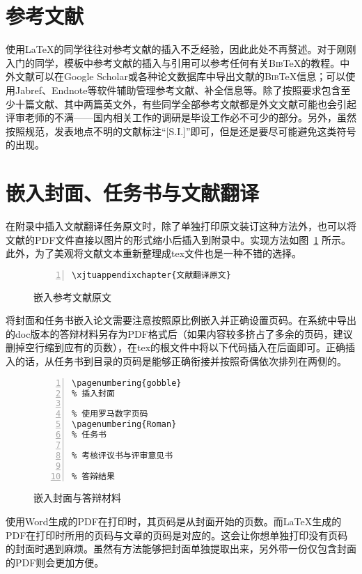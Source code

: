 \section{参考文献}
使用\LaTeX 的同学往往对参考文献的插入不乏经验，因此此处不再赘述。对于刚刚入门的同学，模板中参考文献的插入与引用可以参考任何有关\textsc{Bib}\TeX 的教程。中外文献可以在Google Scholar或各种论文数据库中导出文献的\textsc{Bib}\TeX 信息；可以使用Jabref、Endnote等软件辅助管理参考文献、补全信息等。除了按照要求包含至少十篇文献、其中两篇英文外，有些同学全部参考文献都是外文文献可能也会引起评审老师的不满——国内相关工作的调研是毕设工作必不可少的部分。另外，虽然按照规范，发表地点不明的文献标注``[S.I.]''即可，但是还是要尽可能避免这类符号的出现。

\section{嵌入封面、任务书与文献翻译}

在附录中插入文献翻译任务原文时，除了单独打印原文装订这种方法外，也可以将文献的PDF文件直接以图片的形式缩小后插入到附录中。实现方法如图~\ref{fig:fig_trans}
所示。此外，为了美观将文献文本重新整理成tex文件也是一种不错的选择。
\begin{figure}[h]
  {
  \fontsize{10pt}{12pt}\selectfont
  \setmainfont{Courier New}
  \begin{lstlisting}[showstringspaces=false,numbers=left,xleftmargin=3em]
\xjtuappendixchapter{文献翻译原文}

  \end{lstlisting}
  }
\caption{嵌入参考文献原文}
\label{fig:fig_trans}
\end{figure}

将封面和任务书嵌入论文需要注意按照原比例嵌入并正确设置页码。在系统中导出的doc版本的答辩材料另存为PDF格式后（如果内容较多挤占了多余的页码，建议删掉空行缩到应有的页数），在tex的根文件中将以下代码插入在\verb||后面即可。正确插入的话，从任务书到目录的页码是能够正确衔接并按照奇偶依次排列在两侧的。
\begin{figure}[h]
  {
  \fontsize{10pt}{12pt}\selectfont
  \setmainfont{Courier New}
  \begin{lstlisting}[showstringspaces=false,numbers=left,xleftmargin=3em]
% 停止页码编号
\pagenumbering{gobble}
% 插入封面

% 使用罗马数字页码
\pagenumbering{Roman}
% 任务书

% 考核评议书与评审意见书

% 答辩结果

  \end{lstlisting}
  }
\caption{嵌入封面与答辩材料}
\label{fig:fig_cover}
\end{figure}

使用Word生成的PDF在打印时，其页码是从封面开始的页数。而\LaTeX 生成的PDF在打印时所用的页码与文章的页码是对应的。这会让你想单独打印没有页码的封面时遇到麻烦。虽然有方法能够把封面单独提取出来，另外带一份仅包含封面的PDF则会更加方便。
